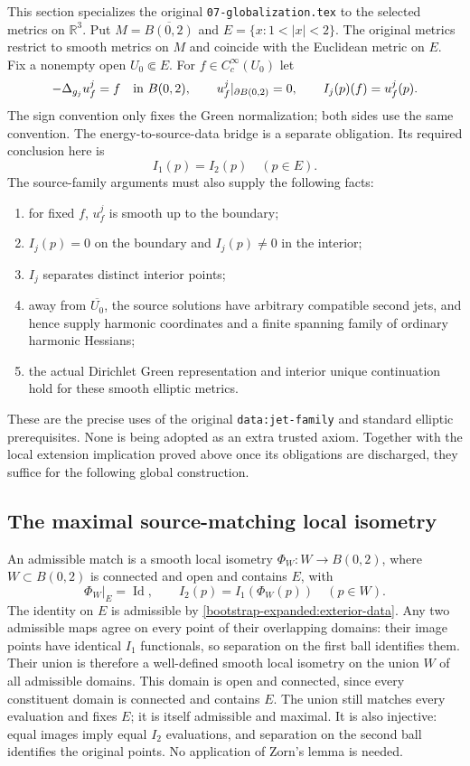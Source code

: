 \documentclass[11pt]{article}
\theoremstyle{definition}
\theoremstyle{remark}
\numberwithin{equation}{section}
\begin{document}
This section specializes the original \texttt{07-globalization.tex} to
the selected metrics on $\mathbb R^3$.  Put
$M=\overline{B(0,2)}$ and $E=\{x:1<|x|<2\}$.  The original
metrics restrict to smooth metrics on $M$ and coincide with the
Euclidean metric on $E$.  Fix a nonempty open
$U_0\Subset E$.  For $f\in C_c^\infty(U_0)$ let
\[
 -\Delta_{g_j}u_f^j=f\quad\hbox{in }B(0,2),\qquad
 u_f^j|_{\partial B(0,2)}=0,\qquad
 I_j(p)(f)=u_f^j(p).
\]
The sign convention only fixes the Green normalization; both sides use
the same convention.  The energy-to-source-data bridge is a separate
obligation.  Its required conclusion here is
\begin{equation}
 I_1(p)=I_2(p)\quad(p\in E).
 \label{bootstrap-expanded:exterior-data}
\end{equation}
The source-family arguments must also supply the following facts:
\begin{enumerate}
 \item for fixed $f$, $u_f^j$ is smooth up to the boundary;
 \item $I_j(p)=0$ on the boundary and $I_j(p)\ne0$ in the interior;
 \item $I_j$ separates distinct interior points;
 \item away from $\overline{U_0}$, the source solutions have arbitrary
       compatible second jets, and hence supply harmonic coordinates
       and a finite spanning family of ordinary harmonic Hessians;
 \item the actual Dirichlet Green representation and interior unique
       continuation hold for these smooth elliptic metrics.
\end{enumerate}
These are the precise uses of the original
\texttt{data:jet-family} and standard elliptic prerequisites.  None is
being adopted as an extra trusted axiom.  Together with the local
extension implication proved above once its obligations are discharged,
they suffice for the following global construction.

\subsection{The maximal source-matching local isometry}
\label{bootstrap-expanded:maximal}

An admissible match is a smooth local isometry
$\Phi_W:W\to B(0,2)$, where $W\subset B(0,2)$ is connected and
open and contains $E$, with
\[
 \Phi_W|_E=\operatorname{Id},\qquad
 I_2(p)=I_1(\Phi_W(p))\quad(p\in W).
\]
The identity on $E$ is admissible by
\eqref{bootstrap-expanded:exterior-data}.  Any two admissible maps agree on every
point of their overlapping domains: their image points have identical
$I_1$ functionals, so separation on the first ball identifies them.
Their union is therefore a well-defined smooth local isometry on the
union $W$ of all admissible domains.  This domain is open and connected,
since every constituent domain is connected and contains $E$.
The union still matches every evaluation and fixes $E$; it is itself
admissible and maximal.  It is also injective: equal images imply
equal $I_2$ evaluations, and separation on the second ball identifies
the original points.  No application of Zorn's lemma is needed.
\end{document}
